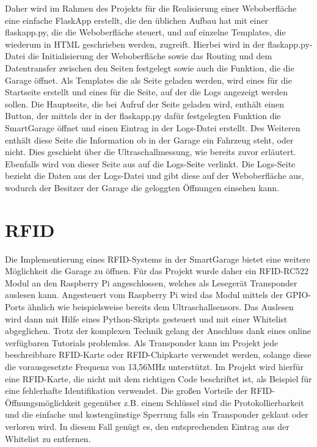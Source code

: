 Daher wird im Rahmen des Projekts für die Realisierung einer Weboberfläche eine einfache FlaskApp erstellt, die den üblichen Aufbau hat mit einer flaskapp.py, die die Weboberfläche steuert, und auf einzelne Templates, die wiederum in HTML geschrieben werden, zugreift. Hierbei wird in der flaskapp.py-Datei die Initialisierung der Weboberfläche sowie das Routing und dem Datentransfer zwischen den Seiten festgelegt sowie auch die Funktion, die die Garage öffnet. Als Templates die als Seite geladen werden, wird eines für die Startseite erstellt und eines für die Seite, auf der die Logs angezeigt werden sollen. Die Hauptseite, die bei Aufruf der Seite geladen wird, enthält einen Button, der mittels der in der flaskapp.py dafür festgelegten Funktion die SmartGarage öffnet und einen Eintrag in der Logs-Datei erstellt. Des Weiteren enthält diese Seite die Information ob in der Garage ein Fahrzeug steht, oder nicht. Dies geschieht über die Ultraschallmessung, wie bereits zuvor erläutert. Ebenfalls wird von dieser Seite aus auf die Logs-Seite verlinkt. Die Logs-Seite bezieht die Daten aus der Logs-Datei und gibt diese auf der Weboberfläche aus, wodurch der Besitzer der Garage die geloggten Öffnungen einsehen kann.

\section{RFID}

Die Implementierung eines RFID-Systems in der SmartGarage bietet eine weitere Möglichkeit die Garage zu öffnen. Für das Projekt wurde daher ein RFID-RC522 Modul an den Raspberry Pi angeschlossen, welches als Lesegerät Transponder auslesen kann. Angesteuert vom Raspberry Pi wird das Modul mittels der GPIO-Ports ähnlich wie beispielsweise bereits dem Ultraschallsensors. Das Auslesen wird dann mit Hilfe eines Python-Skripts gesteuert und mit einer Whitelist abgeglichen.
Trotz der komplexen Technik gelang der Anschluss dank eines online verfügbaren Tutorials problemlos.\autocite[Vgl.][]{tutorialrfikd}
Als Transponder kann im Projekt jede beschreibbare RFID-Karte oder RFID-Chipkarte verwendet werden, solange diese die vorausgesetzte Frequenz von 13,56MHz unterstützt. Im Projekt wird hierfür eine RFID-Karte, die nicht mit dem richtigen Code beschriftet ist, als Beispiel für eine fehlerhafte Identifikation verwendet. 
Die großen Vorteile der RFID-Öffnungsmöglichkeit gegenüber z.B. einem Schlüssel sind die Protokollierbarkeit und die einfache und kostengünstige Sperrung falls ein Transponder geklaut oder verloren wird. In diesem Fall genügt es, den entsprechenden Eintrag aus der Whitelist zu entfernen. 


